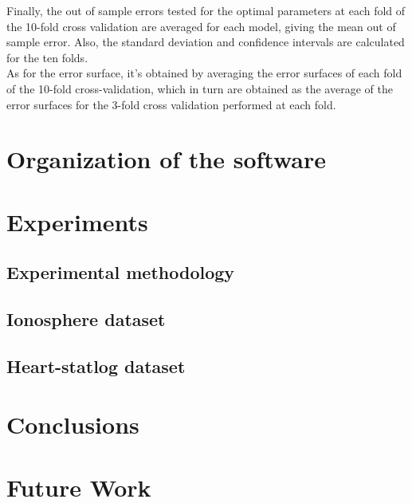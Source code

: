 \documentclass[10pt, journal]{IEEEtran}
\begin{document}
Finally, the out of sample errors tested for the optimal parameters at each fold of the 10-fold cross validation are averaged for each model, giving the mean out of sample error. Also, the standard deviation and confidence intervals are calculated for the ten folds.\\

As for the error surface, it’s obtained by averaging the error surfaces of each fold of the 10-fold cross-validation, which in turn are obtained as the average of the error surfaces for the 3-fold cross validation performed at each fold.\\


\section{Organization of the software} %
\label{sec:organization_of_the_software}



\section{Experiments} %
\label{sec:experiments}

\subsection{Experimental methodology} %
\label{sub:experimental_methodology}


\subsection{Ionosphere dataset} %
\label{sub:ionosphere_dataset}


\subsection{Heart-statlog dataset} %
\label{sub:heart_statlog_dataset}


\section{Conclusions} %
\label{sec:conclusions}


\section{Future Work} %
\label{sec:future_work}




\end{document}
